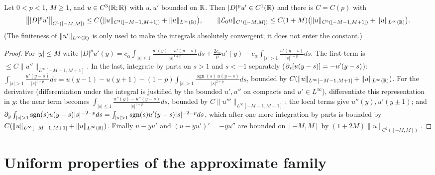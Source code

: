 \begin{lemma}
  \label{lem:c07_local_fractional}
  Let $0<p<1$, $M\ge1$, and $u\in C^3(\mathbb{R};\mathbb{R})$ with $u,u'$ bounded on $\mathbb{R}$. Then $|D|^pu'\in C^1(\mathbb{R})$
  and there is $C=C(p)$ with
  \[
    \bigl\||D|^pu'\bigr\|_{C^1([-M,M])}\le C\bigl(\|u\|_{C^3([-M-1,M+1])}+\|u\|_{L^\infty(\mathbb{R})}\bigr),
    \qquad
    \|\mathcal{L}_0u\|_{C^1([-M,M])}\le C(1+M)\bigl(\|u\|_{C^3([-M-1,M+1])}+\|u\|_{L^\infty(\mathbb{R})}\bigr).
  \]
  (The finiteness of $\|u'\|_{L^\infty(\mathbb{R})}$ is only used to make the integrals absolutely convergent;
  it does not enter the constant.)
\end{lemma}
\begin{proof}
  For $|y|\le M$ write $|D|^pu'(y)=c_\alpha\int_{|s|\le1}\frac{u'(y)-u'(y-s)}{|s|^{1+p}}ds+\frac{2c_\alpha}{p}u'(y)-c_\alpha\int_{|s|>1}\frac{u'(y-s)}{|s|^{1+p}}ds$.
  The first term is $\le C\|u''\|_{L^\infty[-M-1,M+1]}$. In the last, integrate by parts on
  $s>1$ and $s<-1$ separately ($\partial_s[u(y-s)]=-u'(y-s)$):
  $\int_{|s|>1}\frac{u'(y-s)}{|s|^{1+p}}ds=u(y-1)-u(y+1)-(1+p)\int_{|s|>1}\frac{\operatorname{sgn}(s)\,u(y-s)}{|s|^{2+p}}ds$,
  bounded by $C(\|u\|_{L^\infty[-M-1,M+1]}+\|u\|_{L^\infty(\mathbb{R})})$. For the derivative (differentiation
  under the integral is justified by the bounded $u',u''$ on compacts and $u'\in L^\infty$), differentiate
  this representation in $y$: the near term becomes $\int_{|s|\le1}\frac{u''(y)-u''(y-s)}{|s|^{1+p}}ds$,
  bounded by $C\|u'''\|_{L^\infty[-M-1,M+1]}$; the local terms give $u''(y),u'(y\pm1)$; and
  $\p_y\int_{|s|>1}\operatorname{sgn}(s)u(y-s)|s|^{-2-p}ds=\int_{|s|>1}\operatorname{sgn}(s)u'(y-s)|s|^{-2-p}ds$,
  which after one more integration by parts is bounded by $C(\|u\|_{L^\infty[-M-1,M+1]}+\|u\|_{L^\infty(\mathbb{R})})$.
  Finally $u-yu'$ and $(u-yu')'=-yu''$ are bounded on $[-M,M]$ by $(1+2M)\|u\|_{C^2([-M,M])}$.
\end{proof}

\section{Uniform properties of the approximate family}

